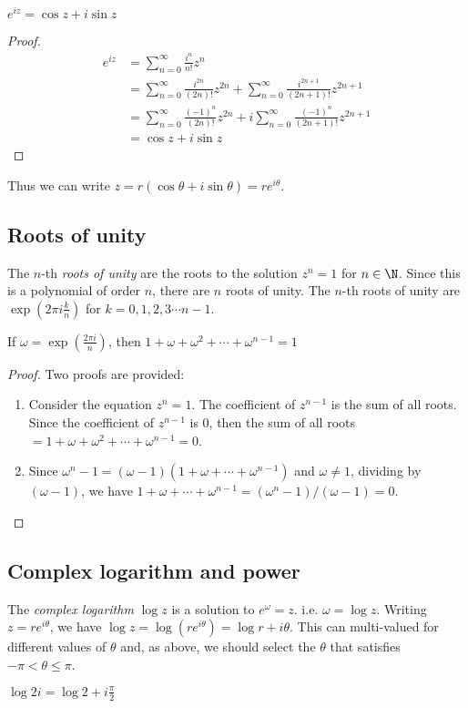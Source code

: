 \documentclass[a4paper]{article}
\begin{document}
\begin{thm}
  $e^{iz} = \cos z + i\sin z$
\end{thm}

\begin{proof}
  \begin{align*}
  e^{iz} &= \sum_{n=0}^\infty \frac{i^n}{n!}z^n\\
  &= \sum_{n=0}^\infty \frac{i^{2n}}{(2n)!}z^{2n} + \sum_{n=0}^\infty \frac{i^{2n+1}}{(2n+1)!}z^{2n+1}\\
  &= \sum_{n=0}^\infty \frac{(-1)^n}{(2n)!}z^{2n} + i \sum_{n=0}^\infty \frac{(-1)^n}{(2n+1)!}z^{2n+1}\\
  &= \cos z + i\sin z
  \end{align*}
\end{proof}
Thus we can write $z = r(\cos\theta + i\sin\theta) = re^{i\theta}$.

\subsection{Roots of unity}
\begin{defi}
  The $n$-th \emph{roots of unity} are the roots to the solution $z^n = 1$ for $n\in \N$. Since this is a polynomial of order $n$, there are $n$ roots of unity. The $n$-th roots of unity are $\exp\left(2\pi i\frac{k}{n}\right)$ for $k = 0, 1, 2, 3\cdots n - 1$.
\end{defi}

\begin{prop}
  If $\omega = \exp\left(\frac{2\pi i}{n}\right)$, then $1 + \omega + \omega^2 + \cdots + \omega^{n - 1} = 1$
\end{prop}

\begin{proof}
  Two proofs are provided:
  \begin{enumerate}
  \item Consider the equation $z^n = 1$. The coefficient of $z^{n-1}$ is the sum of all roots. Since the coefficient of $z^{n-1}$ is 0, then the sum of all roots $= 1 + \omega + \omega^2 + \cdots + \omega^{n-1} = 0$.
  \item Since $\omega^n - 1 = (\omega - 1)(1 + \omega + \cdots + \omega^{n - 1})$ and $\omega \not= 1$, dividing by $(\omega - 1)$, we have $1 + \omega + \cdots + \omega^{n-1} = (\omega^n - 1)/(\omega - 1) = 0$.
  \end{enumerate}
\end{proof}

\subsection{Complex logarithm and power}
\begin{defi}
  The \emph{complex logarithm} $\log z$ is a solution to $e^\omega = z$. i.e. $\omega = \log z$. Writing $z = re^{i\theta}$, we have $\log z = \log(re^{i\theta}) = \log r + i\theta$. This can multi-valued for different values of $\theta$ and, as above, we should select the $\theta$ that satisfies $-\pi < \theta \leq \pi$.
\end{defi}
\begin{eg}
  $\log 2i = \log 2 + i\frac{\pi}{2}$
\end{eg}
\end{document}
